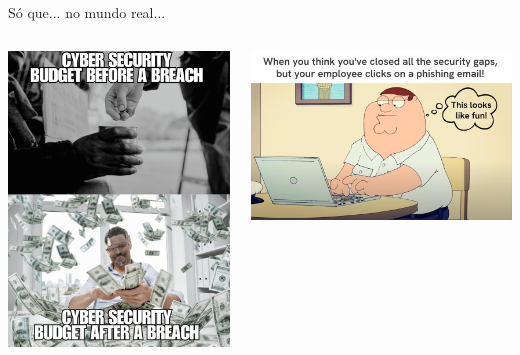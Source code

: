 \begin{frame}{Só que... no mundo real...}
\centering
\begin{columns}
    \begin{column}{0.48\linewidth}
        \includegraphics[width=0.8\linewidth]{Figuras/budget-seguranca-antes-depois.png}

    \end{column}
    \begin{column}{0.48\linewidth}
        \includegraphics[width=\linewidth]{Figuras/empregado-clicou-errado.png}
    \end{column}
\end{columns}


\end{frame}


